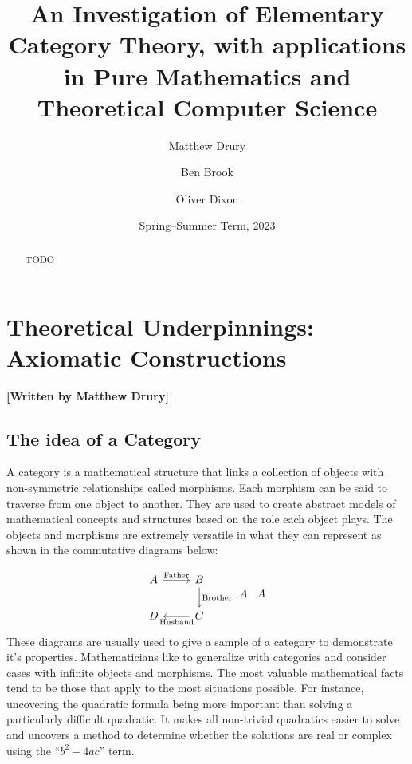 \documentclass[10pt,a4paper,reqno]{amsart}
\title[An Investigation of Elementary Category Theory]{An Investigation of %
        Elementary Category Theory, with applications in Pure Mathematics and %
        Theoretical Computer Science}
\author{Matthew Drury} \email{\yorkemail{md1499}}
\author{Ben Brook}     \email{\yorkemail{bb1170}}
\author{Oliver Dixon}  \email{\yorkemail{od641}}
\date{Spring--Summer Term, 2023}
\numberwithin{figure}{section}
\begin{document}
\begin{abstract}
        TODO
\end{abstract}
\maketitle
\tableofcontents
\section{Theoretical %
        Underpinnings: Axiomatic Constructions}
\begin{flushright}
        \textbf{[Written by Matthew Drury]}
\end{flushright}

\subsection{The idea of a Category}
A category is a mathematical structure that links a collection of objects with
non-symmetric relationships called morphisms.  Each morphism can be said to
traverse from one object to another.  They are used to create abstract models of
mathematical concepts and structures based on the role each object plays. The
objects and morphisms are extremely versatile in what they can represent as
shown in the commutative diagrams below:

\begin{equation}
        \begin{tikzcd}
                A \ar[r,"\text{Father}"] & B \ar[d,"\text{Brother}"] \\
                D & C \ar[l,"\text{Husband}"]
        \end{tikzcd}
        \begin{tikzcd}
        A
        \end{tikzcd}
        \begin{tikzcd}
        A
        \end{tikzcd}
\end{equation}
These diagrams are usually used to give a sample of a category to demonstrate
it's properties.  Mathematicians like to generalize with categories and consider
cases with infinite objects and morphisms.  The most valuable mathematical facts
tend to be those that apply to the most situations possible.  For instance,
uncovering the quadratic formula being more important than solving a
particularly difficult quadratic.  It makes all non-trivial quadratics easier to
solve and uncovers a method to determine whether the solutions are real or
complex using the ``$b^2-4ac$'' term.
\end{document}
